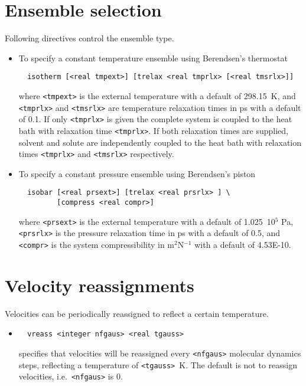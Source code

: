 \section{Ensemble selection}
Following directives control the ensemble type.
\begin{itemize}
\item
To specify a constant temperature ensemble using Berendsen's thermostat
\begin{verbatim}
  isotherm [<real tmpext>] [trelax <real tmprlx> [<real tmsrlx>]]
\end{verbatim}
where \verb+<tmpext>+ is the external temperature with a default of 298.15~K,
and \verb+<tmprlx>+ and \verb+<tmsrlx>+ are temperature relaxation times in ps 
with a default of 0.1. If only \verb+<tmprlx>+ is given the complete system
is coupled to the heat bath with relaxation time \verb+<tmprlx>+. If both
relaxation times are supplied, solvent and solute are independently coupled
to the heat bath with relaxation times \verb+<tmprlx>+ and \verb+<tmsrlx>+
respectively.
\item
To specify a constant pressure ensemble using Berendsen's piston
\begin{verbatim}
  isobar [<real prsext>] [trelax <real prsrlx> ] \
         [compress <real compr>]
\end{verbatim}
where \verb+<prsext>+ is the external temperature with a default of 1.025~10$^5$ Pa,
\verb+<prsrlx>+ is the pressure relaxation time in ps with a default of 0.5, and
\verb+<compr>+ is the system compressibility in m$^2$N$^{-1}$ with a
default of 4.53E-10.
\end{itemize}

\section{Velocity reassignments}
Velocities can be periodically reassigned to reflect a certain temperature.
\begin{itemize}
\item
\begin{verbatim}
  vreass <integer nfgaus> <real tgauss>
\end{verbatim}
specifies that velocities will be reassigned every \verb+<nfgaus>+ molecular
dynamics steps, reflecting a temperature of \verb+<tgauss>+~K. The default
is not to reassign velocities, i.e.\ \verb+<nfgaus>+ is 0.
\end{itemize}

